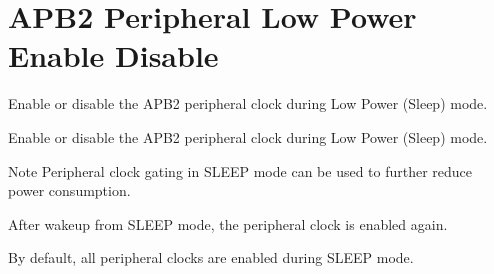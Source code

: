 \hypertarget{group___r_c_c_ex___a_p_b2___low_power___enable___disable}{}\section{A\+P\+B2 Peripheral Low Power Enable Disable}
\label{group___r_c_c_ex___a_p_b2___low_power___enable___disable}


Enable or disable the A\+P\+B2 peripheral clock during Low Power (Sleep) mode.  


Enable or disable the A\+P\+B2 peripheral clock during Low Power (Sleep) mode. 

\begin{DoxyNote}{Note}
Peripheral clock gating in S\+L\+E\+EP mode can be used to further reduce power consumption. 

After wakeup from S\+L\+E\+EP mode, the peripheral clock is enabled again. 

By default, all peripheral clocks are enabled during S\+L\+E\+EP mode. 
\end{DoxyNote}
